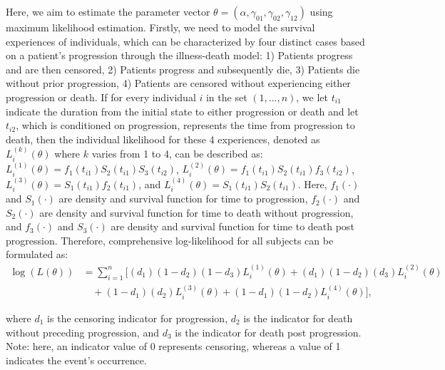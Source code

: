 Here, we aim to estimate the parameter vector $\theta = (\alpha, \gamma_{01}, \gamma_{02}, \gamma_{12})$ using maximum likelihood estimation. Firstly, we need to model the survival experiences of individuals, which can be characterized by four distinct cases based on a patient's progression through the illness-death model:
1) Patients progress and are then censored,
2) Patients progress and subsequently die,
3) Patients die without prior progression,
4) Patients are censored without experiencing either progression or death. If for every individual \( i \) in the set \( (1, ..., n) \), we let \( t_{i1} \) indicate the duration from the initial state to either progression or death and let \( t_{i2} \), which is conditioned on progression, represents the time from progression to death, then the individual likelihood for these 4 experiences, denoted as \( L_i^{(k)}(\theta) \) where \( k \) varies from 1 to 4, can be described as: $L_i^{(1)}(\theta) = f_1(t_{i1})S_2(t_{i1})S_3(t_{i2})$, $L_i^{(2)}(\theta) = f_1(t_{i1})S_2(t_{i1})f_3(t_{i2})$, $L_i^{(3)}(\theta) = S_1(t_{i1})f_2(t_{i1})$, and $L_i^{(4)}(\theta) = S_1(t_{i1})S_2(t_{i1})$. Here, \( f_1(\cdot) \) and \( S_1(\cdot) \) are density and survival function for time to progression, \( f_2(\cdot) \) and \( S_2(\cdot) \) are density and survival function for time to death without progression, and \( f_3(\cdot) \) and \( S_3(\cdot) \) are density and survival function for time to death post progression. Therefore, comprehensive log-likelihood for all subjects can be formulated as:
\[
\begin{aligned}
\log(L(\theta)) &= \sum_{i=1}^{n}[(d_1)(1-d_2)(1-d_3)L_i^{(1)}(\theta) + (d_1)(1-d_2)(d_3)L_i^{(2)}(\theta) \\
&\quad +(1-d_1)(d_2)L_i^{(3)}(\theta) + (1-d_1)(1-d_2)L_i^{(4)}(\theta)],
\end{aligned}
\]

where \( d_1 \) is the censoring indicator for progression, \( d_2 \) is the indicator for death without preceding progression, and \( d_3 \) is the indicator for death post progression. Note: here, an indicator value of 0 represents censoring, whereas a value of 1 indicates the event's occurrence.


